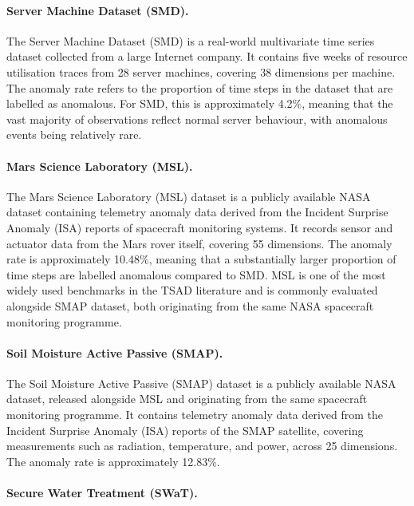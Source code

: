 \documentclass[twoside,11pt,openright]{report}
\begin{document}
\paragraph{Server Machine Dataset (SMD).}

The Server Machine Dataset (SMD) \cite{su2019smd} is a real-world multivariate time series dataset
collected from a large Internet company. It contains five weeks of resource utilisation traces
from 28 server machines, covering 38 dimensions per machine.
The anomaly rate refers to the proportion of time steps in the dataset that are labelled as
anomalous. For SMD, this is approximately 4.2\%, meaning
that the vast majority of observations reflect normal server behaviour, with anomalous events
being relatively rare. 

\paragraph{Mars Science Laboratory (MSL).}

The Mars Science Laboratory (MSL) \cite{hundman2018smap} dataset is a publicly available NASA dataset
containing telemetry anomaly data derived from the Incident
Surprise Anomaly (ISA) reports of spacecraft monitoring systems.
It records sensor and actuator data from the Mars rover itself, covering 55 dimensions. 
The anomaly rate is approximately 10.48\%, meaning that a substantially larger
proportion of time steps are labelled anomalous compared to SMD. MSL is one of the
most widely used benchmarks in the TSAD literature and
is commonly evaluated alongside SMAP dataset, both originating from the
same NASA spacecraft monitoring programme.

\paragraph{Soil Moisture Active Passive (SMAP).}

The Soil Moisture Active Passive (SMAP) dataset \cite{hundman2018smap}
is a publicly available NASA dataset, released alongside MSL and originating from the same
spacecraft monitoring programme. It contains telemetry anomaly data derived from the
Incident Surprise Anomaly (ISA) reports of the SMAP satellite, covering measurements
such as radiation, temperature, and power, across 25 dimensions. 
The anomaly rate is approximately 12.83\%. 

\paragraph{Secure Water Treatment (SWaT).}
\end{document}
